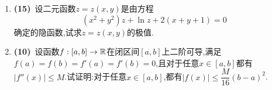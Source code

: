 \documentclass{ctexart}
\begin{document}
\begin{enumerate}[leftmargin=*,label=\textbf{\arabic*.}]
\begin{enumerate}[label=\tbf{(\arabic*)}]
\[\begin{array}{l}
                    \dfrac{2xy^3}{x^2+y^4},(x,y)\neq(0,0)\\
                    0,(x,y)=(0,0)
                \end{array}\right.\]计算方向导数$\left.\dfrac{\p f}{\p\mbf{l}}\right|_{(0,0)}$.其中单位向量$\mbf{l}=(\cos\alpha,\sin\alpha)$,$\alpha\in[0,2\pi)$.
            \item \textbf{(3)}\ 若二元函数$g(x,y)$在$(x_0,y_0)$处取到极小值,那么对于某一$\alpha\in[0,2\pi)$,$t=0$是否一定是$h(t)=g(x_0+t\cos\alpha,y_0+t\sin\alpha)$的极小值点?说明理由.
            \item \textbf{(2)}\ 若对于任意$\alpha\in[0,2\pi)$,$t=0$是$h(t)=g(x_0+t\cos\alpha,y_0+t\sin\alpha)$的极小值点,那么$(x_0,y_0)$是否一定是$g(x,y)$的极小值点?说明理由.
        \end{enumerate}
    \item \textbf{(15)}\ 设二元函数$z=z(x,y)$是由方程
        \[(x^2+y^2)z+\ln z+2(x+y+1)=0\]确定的隐函数,试求$z=z(x,y)$的极值.
    \item \textbf{(10)}\ 设函数$f:[a,b]\to\mathbb{R}$在闭区间$[a,b]$上二阶可导,满足$f(a)=f(b)=f'(a)=f'(b)=0$,且对于任意$x\in[a,b]$都有$|f''(x)|\leqslant M$.试证明:对于任意$x\in[a,b]$,都有$|f(x)|\leqslant\dfrac{M}{16}(b-a)^2$.
\end{enumerate}
\end{document}
